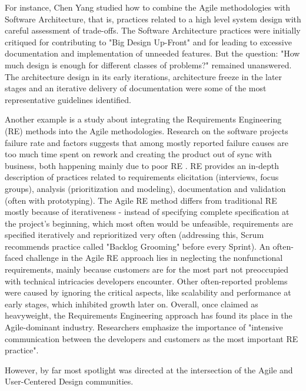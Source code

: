 \documentclass{article}
\begin{document}
For instance, Chen Yang \cite{yang2016systematic} studied how to combine the Agile methodologies with Software Architecture, that is, practices related to a high level system design with careful assessment of trade-offs. The Software Architecture practices were initially critiqued for contributing to "Big Design Up-Front" and for leading to excessive documentation and implementation of unneeded features. But the question: "How much design is enough for different classes of problems?" remained unanswered. The architecture design in its early iterations, architecture freeze in the later stages and an iterative delivery of documentation were some of the most representative guidelines identified.

Another example is a study about integrating the Requirements Engineering (RE) methods into the Agile methodologies. Research on the software projects failure rate and factors suggests that among mostly reported failure causes are too much time spent on rework and creating the product out of sync with business, both happening mainly due to poor RE \cite{arcidiacono2017comparative}. RE provides an in-depth description of practices related to requirements elicitation (interviews, focus groups), analysis (prioritization and modeling), documentation and validation (often with prototyping). The Agile RE method differs from traditional RE mostly because of iterativeness - instead of specifying complete specification at the project's beginning, which most often would be unfeasible, requirements are specified iteratively and reprioritized very often (addressing this, Scrum recommends practice called "Backlog Grooming" before every Sprint\cite{rubin2012essential}). An often-faced challenge in the Agile RE approach lies in neglecting the nonfunctional requirements, mainly because customers are for the most part not preoccupied with technical intricacies developers encounter. Other often-reported problems were caused by ignoring the critical aspects,  like scalability and performance at early stages, which inhibited growth later on. Overall, once claimed as heavyweight, the Requirements Engineering approach has found its place in the Agile-dominant industry. Researchers emphasize the importance of "intensive communication between the developers and customers as the most important RE practice". \cite{paetsch2003requirements} \cite{cao2008Agile} 

However, by far most spotlight was directed at the intersection of the Agile and User-Centered Design communities.
\end{document}
